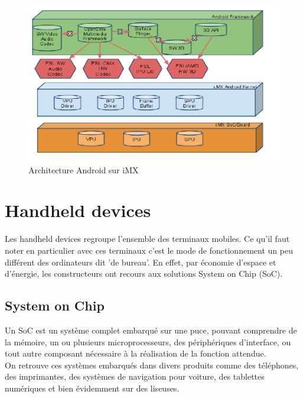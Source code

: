 \begin{figure}[h!]
\begin{center}
	\includegraphics[scale=0.45]{Android.png}
	\caption{Architecture Android sur iMX}
\end{center}
\end{figure}



\newpage

\section{Handheld devices}
Les handheld devices regroupe l'ensemble des terminaux mobiles. Ce qu'il faut noter en particulier avec ces terminaux c'est le mode de fonctionnement un peu différent des ordinateurs dit 'de bureau'. En effet, par économie d'espace et d'énergie, les constructeurs ont recours aux solutions System on Chip (SoC).

\subsection{System on Chip}
Un SoC est un système complet embarqué sur une puce, pouvant comprendre de la mémoire, un ou plusieurs microprocesseurs, des périphériques d'interface, ou tout autre composant nécessaire à la réalisation de la fonction attendue.
\\On retrouve ces systèmes embarqués dans divers produits comme des téléphones, des imprimantes, des systèmes de navigation pour voiture, des tablettes numériques et bien évidemment sur des liseuses.